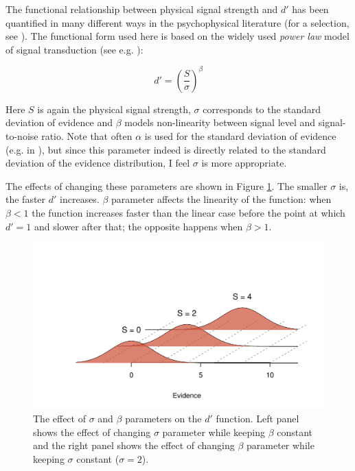 \documentclass{article}\usepackage{knitr}
\begin{document}
The functional relationship between physical signal strength and $d'$ has been quantified in many different ways in the psychophysical literature (for a selection, see \citet[Appendix A]{lesmes2015}). The functional form used here is based on the widely used \textit{power law} model of signal transduction (see e.g. \citet{kontsevichtyler1999, dai2011, lesmes2015}):

\begin{equation}
d' = (\frac{S}{\sigma})^\beta
\label{eq:dprimefunc}
\end{equation}

Here $S$ is again the physical signal strength, $\sigma$ corresponds to the standard deviation of evidence and $\beta$ models non-linearity between signal level and signal-to-noise ratio. Note that often $\alpha$ is used for the standard deviation of evidence (e.g. in \cite{dai2011, kontsevichtyler1999}), but since this parameter indeed is directly related to the standard deviation of the evidence distribution, I feel $\sigma$ is more appropriate. 

The effects of changing these parameters are shown in Figure \ref{fig:dprimefunc}. The smaller $\sigma$ is, the faster $d'$ increases. $\beta$ parameter affects the linearity of the function: when $\beta < 1$ the function increases faster than the linear case before the point at which $d' = 1$ and slower after that; the opposite happens when $\beta > 1$. 

\begin{figure}[!htb]
\begin{center}
\begin{knitrout}
\color{fgcolor}
\includegraphics[width=\maxwidth]{figure/unnamed-chunk-3-1} 

\end{knitrout}
\end{center}
\caption{ The effect of $\sigma$ and $\beta$ parameters on the $d'$ function. Left panel shows the effect of changing $\sigma$ parameter while keeping $\beta$ constant and the right panel shows the effect of changing $\beta$ parameter while keeping $\sigma$ constant ($\sigma = 2$).}
\label{fig:dprimefunc}
\end{figure}
\end{document}
